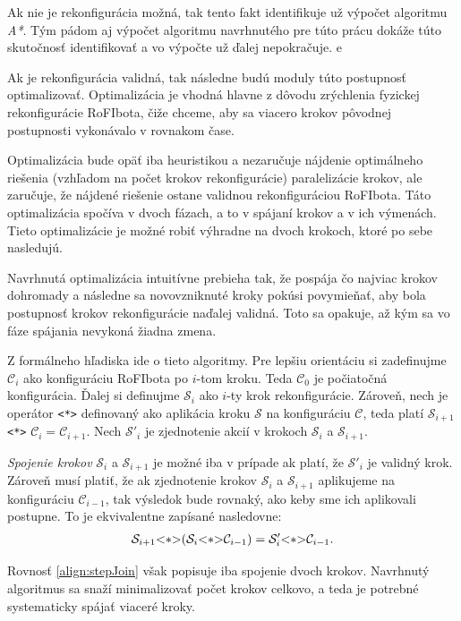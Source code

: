 \documentclass[
  digital, %
  oneside, %
  table,   %
  lof,     %
  nolot,     %
]{fithesis3}
\begin{document}
Ak nie je rekonfigurácia možná, tak tento fakt identifikuje už výpočet algoritmu \textit{A*}. Tým pádom aj výpočet algoritmu navrhnutého pre túto prácu dokáže túto skutočnosť identifikovať a vo výpočte už ďalej nepokračuje. e

Ak je rekonfigurácia validná, tak následne budú moduly túto postupnosť optimalizovať. Optimalizácia je vhodná hlavne z dôvodu zrýchlenia fyzickej rekonfigurácie RoFIbota, čiže chceme, aby sa viacero krokov pôvodnej postupnosti vykonávalo v rovnakom čase. 

Optimalizácia bude opäť iba heuristikou a nezaručuje nájdenie optimálneho riešenia (vzhľadom na počet krokov rekonfigurácie) paralelizácie krokov, ale zaručuje, že nájdené riešenie ostane validnou rekonfiguráciou RoFIbota. Táto optimalizácia spočíva v dvoch fázach, a to v spájaní krokov a v ich výmenách. Tieto optimalizácie je možné robiť výhradne na dvoch krokoch, ktoré po sebe nasledujú. 

Navrhnutá optimalizácia intuitívne prebieha tak, že pospája čo najviac krokov dohromady a následne sa novovzniknuté kroky pokúsi povymieňať, aby bola postupnosť krokov rekonfigurácie naďalej validná. Toto sa opakuje, až kým sa vo fáze spájania nevykoná žiadna zmena. 

Z formálneho hľadiska ide o tieto algoritmy. Pre lepšiu orientáciu si zadefinujme $\mathcal{C}_i$ ako konfiguráciu RoFIbota po $i$-tom kroku. Teda $\mathcal{C}_0$ je počiatočná konfigurácia. Ďalej si definujme $\mathcal{S}_i$ ako $i$-ty krok rekonfigurácie. Zároveň, nech je operátor \lstinline{<*>} definovaný ako aplikácia kroku $\mathcal{S}$ na konfiguráciu $\mathcal{C}$, teda platí $\mathcal{S}_{i + 1}$ \lstinline{<*>} $\mathcal{C}_i = \mathcal{C}_{i + 1}$. Nech $\mathcal{S}'_i$ je zjednotenie akcií v krokoch $\mathcal{S}_i$ a $\mathcal{S}_{i + 1}$. 

\textit{Spojenie krokov} $\mathcal{S}_i$ a $\mathcal{S}_{i + 1}$ je možné iba v prípade ak platí, že $\mathcal{S}'_i$ je validný krok. Zároveň musí platiť, že ak zjednotenie krokov $\mathcal{S}_i$ a $\mathcal{S}_{i + 1}$ aplikujeme na konfiguráciu $\mathcal{C}_{i - 1}$, tak výsledok bude rovnaký, ako keby sme ich aplikovali postupne. To je ekvivalentne zapísané nasledovne: 
\begin{align}
\label{align:stepJoin}
\mathcal{S}_{i + 1} \lstinline{<*>} (\mathcal{S}_i \lstinline{<*>} \mathcal{C}_{i - 1}) = \mathcal{S}'_i \lstinline{<*>} \mathcal{C}_{i - 1}. 
\end{align}

Rovnosť \ref{align:stepJoin} však popisuje iba spojenie dvoch krokov. Navrhnutý algoritmus sa snaží minimalizovať počet krokov celkovo, a teda je potrebné systematicky spájať viaceré kroky. 
\end{document}
